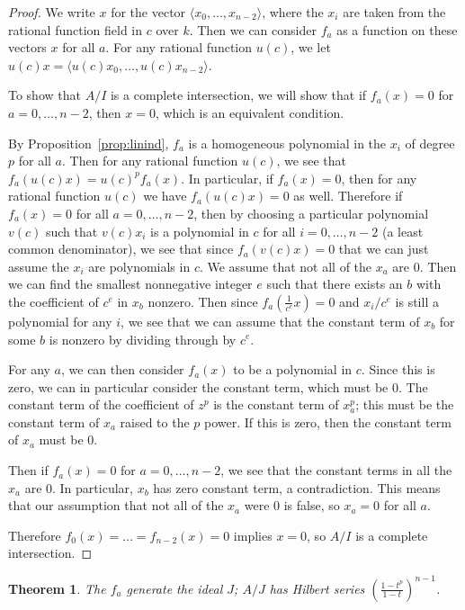 \documentclass{article}
\numberwithin{equation}{section}
\newtheorem{theorem}[equation]{Theorem}
\begin{document}
\begin{proof} 

We write $x$ for the vector $\langle x_0,\dots, x_{n-2} \rangle$, where the $x_i$ are taken from the rational function field in $c$ over $k$. Then we can consider $f_a$ as a function on these vectors $x$ for all $a$. For any rational function $u( c)$, we let $u(c )x=\langle u(c )x_0,\dots, u(c )x_{n-2}\rangle$. 

To show that $A/I$ is a complete intersection, we will show that if $f_a(x)=0$ for $a=0,\dots,n-2$, then $x=0$, which is an equivalent condition. 

By Proposition~\ref{prop:linind}, $f_a$ is a homogeneous polynomial in the $x_i$ of degree $p$ for all $a$. Then for any rational function $u(c )$, we see that $f_a(u(c )x)=u(c )^pf_a(x)$. In particular, if $f_a(x)=0$, then for any rational function $u(c )$ we have $f_a(u(c )x)=0$ as well. Therefore if $f_a(x) = 0$ for all $a=0,\dots,n-2$, then by choosing a particular polynomial $v(c )$ such that $v(c )x_i$ is a polynomial in $c$ for all $i=0,\dots,n-2$ (a least common denominator), we see that since $f_a(v(c )x)=0$ that we can just assume the $x_i$ are polynomials in $c$. We assume that not all of the $x_a$ are $0$. Then we can find the smallest nonnegative integer $e$ such that there exists an $b$ with the coefficient of $c^e$ in $x_b$ nonzero. Then since $f_a(\frac{1}{c^e}x)=0$ and $x_i/c^e$ is still a polynomial for any $i$, we see that we can assume that the constant term of $x_b$ for some $b$ is nonzero by dividing through by $c^e$. 

For any $a$, we can then consider $f_a(x)$ to be a polynomial in $c$. Since this is zero, we can in particular consider the constant term, which must be $0$. The constant term of the coefficient of $z^p$ is the constant term of $x_a^p$; this must be the constant term of $x_a$ raised to the $p$ power. If this is zero, then the constant term of $x_a$ must be $0$. 

Then if $f_a(x) =0$ for $a=0,\dots,n-2$, we see that the constant terms in all the $x_a$ are $0$. In particular, $x_b$ has zero constant term, a contradiction. This means that our assumption that not all of the $x_a$ were $0$ is false, so $x_a=0$ for all $a$. 

Therefore $f_0(x) = \dots = f_{n-2}(x)=0$ implies $x=0$, so $A/I$ is a complete intersection.
\end{proof}

\begin{theorem}\label{thm:main} The $f_a$ generate the ideal $J$; $A/J$ has Hilbert series $\left(\frac{1-t^p}{1-t}\right)^{n-1}$. 
\end{theorem}
\end{document}
